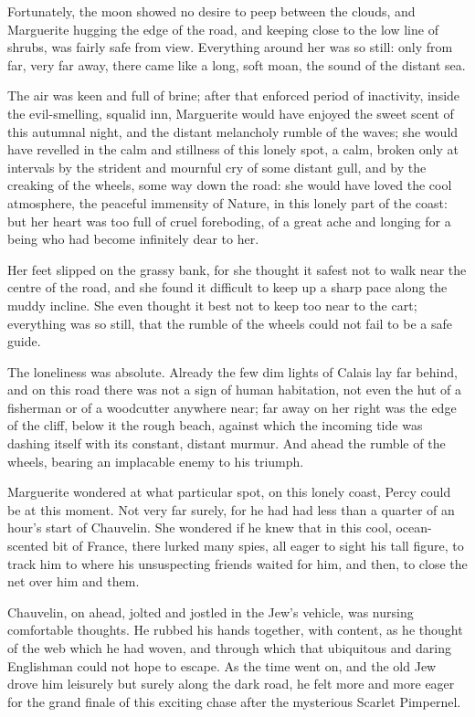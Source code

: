 Fortunately, the moon showed no desire to peep between the clouds, and Marguerite hugging the edge of the road, and keeping close to the low line of shrubs, was fairly safe from view. Everything around her was so still: only from far, very far away, there came like a long, soft moan, the sound of the distant sea.

The air was keen and full of brine; after that enforced period of inactivity, inside the evil-smelling, squalid inn, Marguerite would have enjoyed the sweet scent of this autumnal night, and the distant melancholy rumble of the waves; she would have revelled in the calm and stillness of this lonely spot, a calm, broken only at intervals by the strident and mournful cry of some distant gull, and by the creaking of the wheels, some way down the road: she would have loved the cool atmosphere, the peaceful immensity of Nature, in this lonely part of the coast: but her heart was too full of cruel foreboding, of a great ache and longing for a being who had become infinitely dear to her.

Her feet slipped on the grassy bank, for she thought it safest not to walk near the centre of the road, and she found it difficult to keep up a sharp pace along the muddy incline. She even thought it best not to keep too near to the cart; everything was so still, that the rumble of the wheels could not fail to be a safe guide.

The loneliness was absolute. Already the few dim lights of Calais lay far behind, and on this road there was not a sign of human habitation, not even the hut of a fisherman or of a woodcutter anywhere near; far away on her right was the edge of the cliff, below it the rough beach, against which the incoming tide was dashing itself with its constant, distant murmur. And ahead the rumble of the wheels, bearing an implacable enemy to his triumph.

Marguerite wondered at what particular spot, on this lonely coast, Percy could be at this moment. Not very far surely, for he had had less than a quarter of an hour's start of Chauvelin. She wondered if he knew that in this cool, ocean-scented bit of France, there lurked many spies, all eager to sight his tall figure, to track him to where his unsuspecting friends waited for him, and then, to close the net over him and them.

Chauvelin, on ahead, jolted and jostled in the Jew's vehicle, was nursing comfortable thoughts. He rubbed his hands together, with content, as he thought of the web which he had woven, and through which that ubiquitous and daring Englishman could not hope to escape. As the time went on, and the old Jew drove him leisurely but surely along the dark road, he felt more and more eager for the grand finale of this exciting chase after the mysterious Scarlet Pimpernel.

